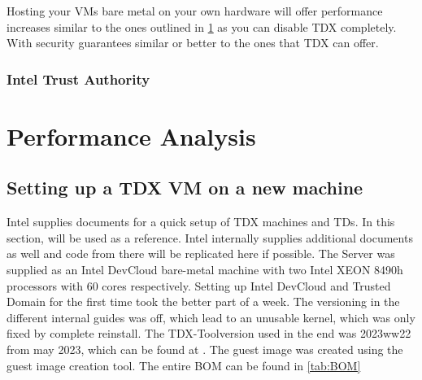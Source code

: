 Hosting your VMs bare metal on your own hardware will offer performance increases similar to the ones outlined in \ref{performance} as you can disable TDX completely. With security guarantees similar or better to the ones that TDX can offer.

\subsection{Intel Trust Authority}


\chapter{Performance Analysis}

\label{performance}

\section{Setting up a TDX VM on a new machine}
\label{ch:SettingUpTDX}
Intel supplies documents for a quick setup of TDX machines and TDs. In this section, \cite{noauthor_white_nodate} will be used as a reference. Intel internally supplies additional documents as well and code from there will be replicated here if possible. The Server was supplied as an Intel DevCloud bare-metal machine with two Intel XEON 8490h processors with 60 cores respectively. Setting up Intel DevCloud and Trusted Domain for the first time took the better part of a week. The versioning in the different internal guides was off, which lead to an unusable kernel, which was only fixed by complete reinstall. The TDX-Toolversion used in the end was 2023ww22 from may 2023, which can be found at \cite{intel_corporation_inteltdx-tools_2024}. The guest image was created using the guest image creation tool. The entire BOM can be found in \cref{tab:BOM}

